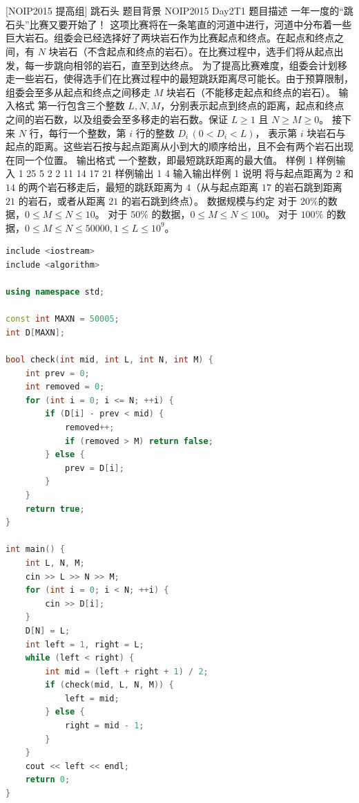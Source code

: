 \documentclass[12pt,twiside,a4paper]{ctexbook}
\numberwithin{chapter}{part}
\begin{document}
\section{}
 [NOIP2015 提高组] 跳石头
 题目背景
NOIP2015 Day2T1
 题目描述
一年一度的“跳石头”比赛又要开始了！
这项比赛将在一条笔直的河道中进行，河道中分布着一些巨大岩石。组委会已经选择好了两块岩石作为比赛起点和终点。在起点和终点之间，有 $N$ 块岩石（不含起点和终点的岩石）。在比赛过程中，选手们将从起点出发，每一步跳向相邻的岩石，直至到达终点。
为了提高比赛难度，组委会计划移走一些岩石，使得选手们在比赛过程中的最短跳跃距离尽可能长。由于预算限制，组委会至多从起点和终点之间移走 $M$ 块岩石（不能移走起点和终点的岩石）。
 输入格式
第一行包含三个整数 $L,N,M$，分别表示起点到终点的距离，起点和终点之间的岩石数，以及组委会至多移走的岩石数。保证 $L \geq 1$ 且 $N \geq M \geq 0$。
接下来 $N$ 行，每行一个整数，第 $i$ 行的整数 $D_i\,( 0 < D_i < L)$， 表示第 $i$ 块岩石与起点的距离。这些岩石按与起点距离从小到大的顺序给出，且不会有两个岩石出现在同一个位置。
 输出格式
一个整数，即最短跳跃距离的最大值。
 样例 1
 样例输入 1
25 5 2 
2
11
14
17 
21
 样例输出 1
4
 输入输出样例 1 说明
将与起点距离为 $2$ 和 $14$ 的两个岩石移走后，最短的跳跃距离为 $4$（从与起点距离 $17$ 的岩石跳到距离 $21$ 的岩石，或者从距离 $21$ 的岩石跳到终点）。
 数据规模与约定
对于 $20\%$的数据，$0 \le M \le N \le 10$。    
对于 $50\%$ 的数据，$0 \le M \le N \le 100$。  
对于 $100\%$ 的数据，$0 \le M \le N \le 50000,1 \le L 
 \le 10^9$。
\begin{lstlisting}[language=c++,breaklines=true]
include <iostream>
include <algorithm>

using namespace std;

const int MAXN = 50005;
int D[MAXN];

bool check(int mid, int L, int N, int M) {
    int prev = 0;
    int removed = 0;
    for (int i = 0; i <= N; ++i) {
        if (D[i] - prev < mid) {
            removed++;
            if (removed > M) return false;
        } else {
            prev = D[i];
        }
    }
    return true;
}

int main() {
    int L, N, M;
    cin >> L >> N >> M;
    for (int i = 0; i < N; ++i) {
        cin >> D[i];
    }
    D[N] = L;
    int left = 1, right = L;
    while (left < right) {
        int mid = (left + right + 1) / 2;
        if (check(mid, L, N, M)) {
            left = mid;
        } else {
            right = mid - 1;
        }
    }
    cout << left << endl;
    return 0;
}
\end{lstlisting}
\end{document}
